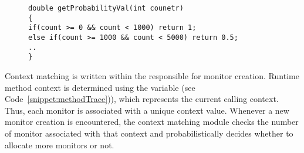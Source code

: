 \begin{figure}[h]
\begin{lstlisting}
double getProbabilityVal(int counetr)
{
if(count >= 0 && count < 1000) return 1;
else if(count >= 1000 && count < 5000) return 0.5;
..
}
\end{lstlisting}
\end{figure}

 Context matching is written within the 
 responsible for monitor creation. Runtime method context is 
determined using the  variable (see 
Code~\ref{snippet:methodTrace})), which represents the current calling context. 
Thus, each monitor is associated with a unique context value. Whenever a new 
monitor creation  is encountered, the context matching module 
checks the number of monitor associated with that context and probabilistically 
decides whether to allocate more monitors or not.

